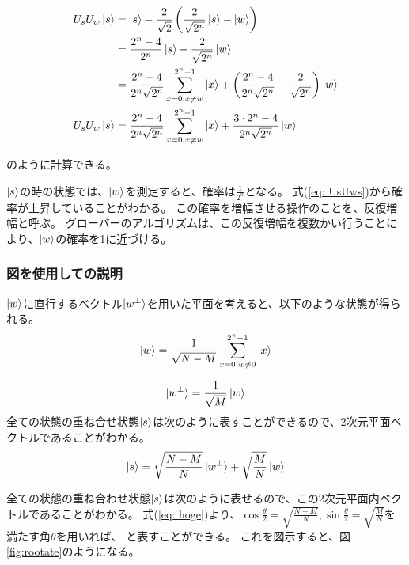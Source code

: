 \begin{equation}
    \label{eq: UsUws}
    \begin{split}
        U_s U_w \ket{s} &= \ket{s} - \frac{2}{\sqrt{2}} \left( \frac{2}{\sqrt{2^n}} \ket{s} - \ket{w} \right)\\
        &= \frac{2^n - 4}{2^n} \ket{s} + \frac{2}{\sqrt{2^n}} \ket{w}\\
        &= \frac{2^n - 4}{2^n \sqrt{2^n}} \sum_{x = 0, x \ne w}^{2^n - 1} \ket{x} + \left( \frac{2^n - 4}{2^n \sqrt{2^n}} + \frac{2}{\sqrt{2^n}} \right) \ket{w}\\
        U_s U_w \ket{s} &= \frac{2^n - 4}{2^n \sqrt{2^n}} \sum_{x = 0, x \ne w}^{2^n - 1} \ket{x} + \frac{3 \cdot 2^n - 4}{2^n \sqrt{2^n}} \ket{w}
    \end{split}
\end{equation}

のように計算できる。

$\ket{s}$の時の状態では、$\ket{w}$を測定すると、確率は$\frac{1}{2^n}$となる。
式(\ref{eq: UsUws})から確率が上昇していることがわかる。
この確率を増幅させる操作のことを、反復増幅と呼ぶ。
グローバーのアルゴリズムは、この反復増幅を複数かい行うことにより、$\ket{w}$の確率を1に近づける。


\subsubsection{図を使用しての説明}

$\ket{w}$に直行するベクトル$\ket{w^{\perp}}$を用いた平面を考えると、以下のような状態が得られる。
\begin{equation}
    \ket{w} = \frac{1}{\sqrt{N - M}} \sum^{2^n - 1}_{x = 0, w \neq 0} \ket{x}
\end{equation}

\begin{equation}
    \ket{w^{\perp}} = \frac{1}{\sqrt{M}} \ket{w}
\end{equation}
全ての状態の重ね合せ状態$\ket{s}$は次のように表すことができるので、2次元平面ベクトルであることがわかる。
\begin{equation}
    \label{eq: hgoe}
    \ket{s} = \sqrt{\frac{N - M}{N}} \ket{w^{\perp}} + \sqrt{\frac{M}{N}}\ket{w}
\end{equation}

全ての状態の重ね合わせ状態$\ket{s}$は次のように表せるので、この2次元平面内ベクトルであることがわかる。
式(\ref{eq: hoge})より、$\cos{\frac{\theta}{2}} = \sqrt{\frac{N - M}{N}}, \sin{\frac{\theta}{2}} = \sqrt{\frac{M}{N}}$を満たす角$\theta$を用いれば、
と表すことができる。
これを図示すると、図\ref{fig:rootate}のようになる。

